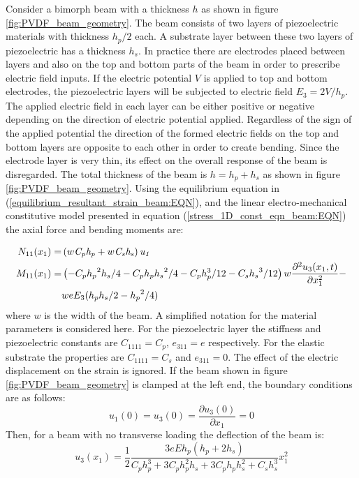 Consider a bimorph beam with a thickness $h$ as shown in figure \ref{fig:PVDF_beam_geometry}.
The beam consists of two layers of piezoelectric materials with thickness $h_p/2$ each.
A substrate layer between these two layers of piezoelectric has a thickness $h_s$.
In practice there are electrodes placed between layers and also on the top and bottom parts of the beam in order to prescribe electric field inputs.
If the electric potential $V$ is applied to top and bottom electrodes, the
 piezoelectric layers will be subjected to electric field $E_3=2V/h_p$.
The applied electric field in each layer can be either positive or negative depending on the direction of electric potential applied.
Regardless of the sign of the applied potential the direction of the formed electric fields on the top and bottom layers are opposite to each other in order to create bending.
Since the electrode layer is very thin, its effect on the overall response of the beam is disregarded.
The total thickness of the beam is $h=h_p+h_s$ as shown in figure \ref{fig:PVDF_beam_geometry}. 
Using the equilibrium equation in (\ref{equilibrium_resultant_strain_beam:EQN}), and the linear electro-mechanical constitutive model
 presented in equation (\ref{stress_1D_const_eqn_beam:EQN}) the axial force and bending moments are:

\begin{equation}
\begin{aligned}
 N_{11} (x_1)=& \left( w{\it C_p} {\it h_p}+w{\it C_s} {\it h_s} \right) {\it u_1} \\
 M_{11} (x_1)=& \left( -  {  C_p} {{  h_p}}^{2}{  h_s}/4- {C_p}
{h_p} {{  h_s}}^{2}/4- {C_p} h_p^3/12- { C_s} {{h_s}}^{3} /12 \right)w
\frac{\partial^2 u_3 (x_1,t)} {\partial x_1^2}-  \\
& w e E_3 ( {h_p} {h_s}/2- {h_p}^{2}/4)
\end{aligned}
\label{EQN:stress_resultant_integration_definistion}
\end{equation}
where
$w$ is the width of the beam.
A simplified notation for the material parameters is considered here.
For the piezoelectric layer the stiffness and piezoelectric constants are $C_{1111}=C_p$, $e_{311}=e$ respectively.
For the elastic substrate the properties are $C_{1111}=C_s$ and $e_{311}=0$.
The effect of the electric displacement on the strain is ignored.
If the beam shown in figure \ref{fig:PVDF_beam_geometry} is clamped at the left end, the boundary conditions are as follows:
\begin{equation}
u_1(0)=u_3(0) =\frac{ \partial u_3(0) } {\partial x_1}=0
\label{Eqn:clamped_beam_boundary_conditions}
\end{equation}
Then, for a beam with no transverse loading the deflection of the beam is:
\begin{equation}
u_3
(x_1)=\frac{1}{2}\frac{3 e E h_p (h_p+2h_s)}{C_p h_p^3+3
C_p h_p^2 h_s+3C_p h_p h_s^2+C_s h_s^3} x_1^2
\label{EQN:deflecction} 
\end{equation}


